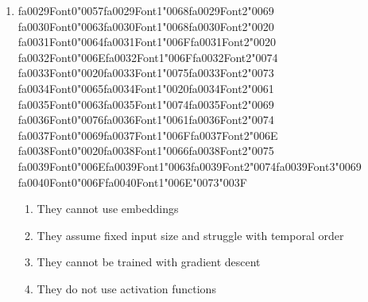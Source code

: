 \documentclass[12pt]{article}
\begin{document}
\begin{enumerate}[label=Q\arabic*.]
\begin{enumerate}[label=(\Alph*)]
    \item To ensure the output values sum to 1, representing a probability distribution
    \item To prevent the gradients from exploding
    \item To increase the speed of the training process
    \item To allow the model to handle variable-length sequences
\end{enumerate}
\item {\csname fa0029Font0\endcsname\char"0057}{\csname fa0029Font1\endcsname\char"0068}{\csname fa0029Font2\endcsname\char"0069} {\csname fa0030Font0\endcsname\char"0063}{\csname fa0030Font1\endcsname\char"0068}{\csname fa0030Font2\endcsname\char"0020} {\csname fa0031Font0\endcsname\char"0064}{\csname fa0031Font1\endcsname\char"006F}{\csname fa0031Font2\endcsname\char"0020} {\csname fa0032Font0\endcsname\char"006E}{\csname fa0032Font1\endcsname\char"006F}{\csname fa0032Font2\endcsname\char"0074} {\csname fa0033Font0\endcsname\char"0020}{\csname fa0033Font1\endcsname\char"0075}{\csname fa0033Font2\endcsname\char"0073} {\csname fa0034Font0\endcsname\char"0065}{\csname fa0034Font1\endcsname\char"0020}{\csname fa0034Font2\endcsname\char"0061} {\csname fa0035Font0\endcsname\char"0063}{\csname fa0035Font1\endcsname\char"0074}{\csname fa0035Font2\endcsname\char"0069} {\csname fa0036Font0\endcsname\char"0076}{\csname fa0036Font1\endcsname\char"0061}{\csname fa0036Font2\endcsname\char"0074} {\csname fa0037Font0\endcsname\char"0069}{\csname fa0037Font1\endcsname\char"006F}{\csname fa0037Font2\endcsname\char"006E} {\csname fa0038Font0\endcsname\char"0020}{\csname fa0038Font1\endcsname\char"0066}{\csname fa0038Font2\endcsname\char"0075} {\csname fa0039Font0\endcsname\char"006E}{\csname fa0039Font1\endcsname\char"0063}{\csname fa0039Font2\endcsname\char"0074}{\csname fa0039Font3\endcsname\char"0069} {\csname fa0040Font0\endcsname\char"006F}{\csname fa0040Font1\endcsname\char"006E}{\char"0073}{\char"003F}
\begin{enumerate}[label=(\Alph*)]
    \item They cannot use embeddings
    \item They assume fixed input size and struggle with temporal order
    \item They cannot be trained with gradient descent
    \item They do not use activation functions
\end{enumerate}

\end{enumerate}
\end{document}

